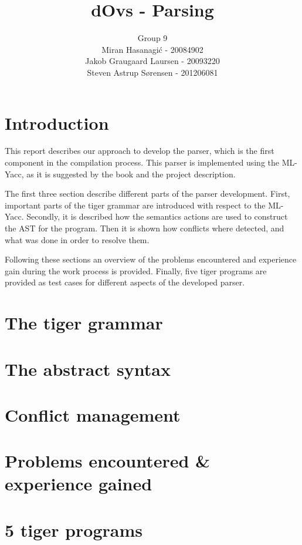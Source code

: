 \documentclass{article}
\title{dOvs - Parsing}
\author{
  Group 9 \\
  Miran Hasanagi\'{c} - 20084902 \\
  Jakob Graugaard Laursen - 20093220\\
  Steven Astrup S\o rensen - 201206081
}
\begin{document}
\maketitle

\section{Introduction}
This report describes our approach to develop the parser, which is the first component in the compilation process. This parser is implemented using the ML-Yacc, as it is suggested by the book and the project description.

The first three section describe different parts of the parser development.
First, important parts of the tiger grammar are introduced with respect to the ML-Yacc. Secondly, it is described how the semantics actions are used to construct the AST for the program. Then it is shown how conflicts where detected, and what was done in order to resolve them.

Following these sections an overview of the problems encountered and experience gain during the work process is provided. Finally, five tiger programs are provided as test cases for different aspects of the developed parser.

\section{The tiger grammar}

\section{The abstract syntax}

\section{Conflict management}

\section{Problems encountered \& experience gained}

\section{5 tiger programs}
\end{document}
